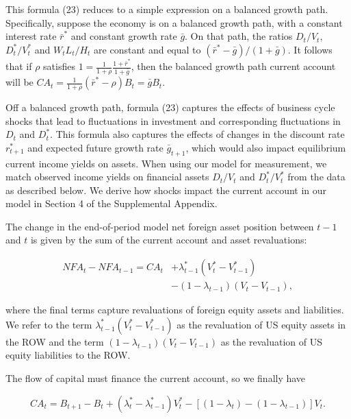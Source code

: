 \documentclass[11pt]{article}
\begin{document}
This formula (23) reduces to a simple expression on a balanced growth path. Specifically, suppose the economy is on a balanced growth path, with a constant interest rate $\bar r^*$ and constant growth rate $\bar g$. On that path, the ratios $D_t/V_t$, $D_t^*/V_t^*$ and $W_tL_t/H_t$ are constant and equal to $(\bar r^*-\bar g)/(1+\bar g)$. It follows that if $\rho$ satisfies $1=\frac{1}{1+\rho}\frac{1+\bar r^*}{1+\bar g}$, then the balanced growth path current account will be $CA_t=\frac{1}{1+\rho}(\bar r^*-\rho)B_t=\bar g B_t$.

Off a balanced growth path, formula (23) captures the effects of business cycle shocks that lead to fluctuations in investment and corresponding fluctuations in $D_t$ and $D_t^*$. This formula also captures the effects of changes in the discount rate $r_{t+1}^*$ and expected future growth rate $\bar g_{t+1}$, which would also impact equilibrium current income yields on assets. When using our model for measurement, we match observed income yields on financial assets $D_t/V_t$ and $D_t^*/V_t^*$ from the data as described below. We derive how shocks impact the current account in our model in Section 4 of the Supplemental Appendix.


The change in the end-of-period model net foreign asset position between $t-1$ and $t$ is given by the sum of the current account and asset revaluations:


\setcounter{equation}{23}
\begin{equation}\label{eq:24}
\begin{aligned}
NFA_t-NFA_{t-1}=CA_t&+\lambda_{t-1}^*(V_t^*-V_{t-1}^*)\\
&-(1-\lambda_{t-1})(V_t-V_{t-1}),
\end{aligned}
\end{equation}


where the final terms capture revaluations of foreign equity assets and liabilities. We refer to the term $\lambda _{t-1}^{*}(V_{t}^{*}-V_{t-1}^{*})$ as the revaluation of US equity assets in the ROW and the term $(1-\lambda _{t-1})(V_{t}-V_{t-1})$ as the revaluation of US equity liabilities to the ROW.


The flow of capital must finance the current account, so we finally have


\setcounter{equation}{24}
\begin{equation}\label{eq:25}
CA_t=B_{t+1}-B_t+(\lambda_t^*-\lambda_{t-1}^*)V_t^*-\left[(1-\lambda_t)-(1-\lambda_{t-1})\right]V_t.
\end{equation}
\end{document}
